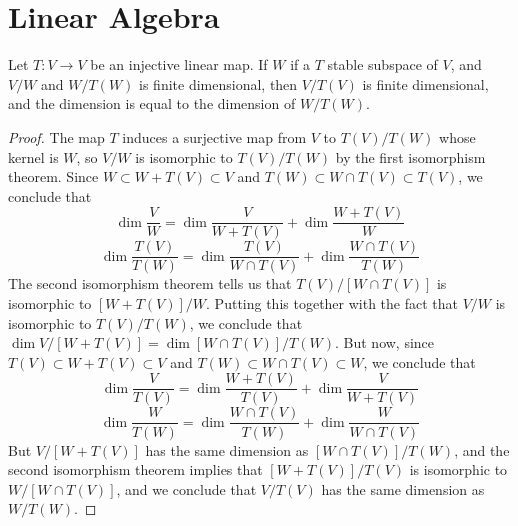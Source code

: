 \chapter{Linear Algebra}

\begin{theorem}
    Let $T:V \to V$ be an injective linear map. If $W$ if a $T$ stable subspace of $V$, and $V/W$ and $W/T(W)$ is finite dimensional, then $V/T(V)$ is finite dimensional, and the dimension is equal to the dimension of $W/T(W)$.
\end{theorem}
\begin{proof}
    The map $T$ induces a surjective map from $V$ to $T(V)/T(W)$ whose kernel is $W$, so $V/W$ is isomorphic to $T(V)/T(W)$ by the first isomorphism theorem. Since $W \subset W + T(V) \subset V$ and $T(W) \subset W \cap T(V) \subset T(V)$, we conclude that
    \[ \dim \frac{V}{W} = \dim \frac{V}{W + T(V)} + \dim \frac{W + T(V)}{W} \]
    \[ \dim \frac{T(V)}{T(W)} = \dim \frac{T(V)}{W \cap T(V)} + \dim \frac{W \cap T(V)}{T(W)} \]
    The second isomorphism theorem tells us that $T(V)/[W \cap T(V)]$ is isomorphic to $[W + T(V)]/W$. Putting this together with the fact that $V/W$ is isomorphic to $T(V)/T(W)$, we conclude that $\dim V/[W + T(V)] = \dim [W \cap T(V)]/T(W)$. But now, since $T(V) \subset W + T(V) \subset V$ and $T(W) \subset W \cap T(V) \subset W$, we conclude that
    \[ \dim \frac{V}{T(V)} = \dim \frac{W + T(V)}{T(V)} + \dim \frac{V}{W + T(V)} \]
    \[ \dim \frac{W}{T(W)} = \dim \frac{W \cap T(V)}{T(W)} + \dim \frac{W}{W \cap T(V)} \]
    But $V/[W + T(V)]$ has the same dimension as $[W \cap T(V)]/T(W)$, and the second isomorphism theorem implies that $[W + T(V)]/T(V)$ is isomorphic to $W/[W \cap T(V)]$, and we conclude that $V/T(V)$ has the same dimension as $W/T(W)$.
\end{proof}

